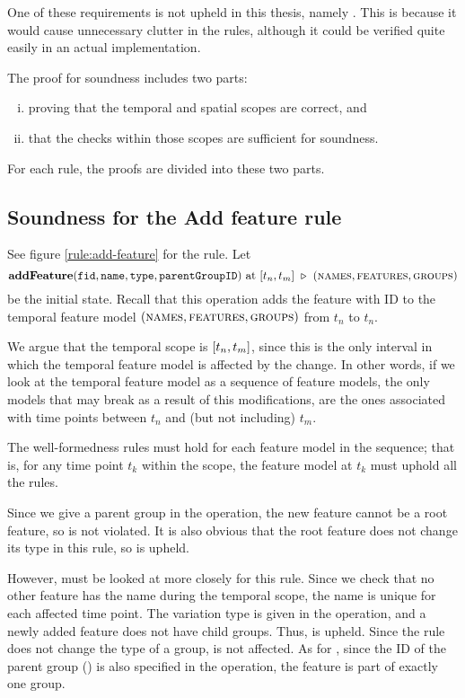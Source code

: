 One of these requirements is not upheld in this thesis, namely . This is because it would cause unnecessary clutter in the rules, although it could be verified quite easily in an actual implementation.

The proof for soundness includes two parts: 
\begin{enumerate}[(i)]
   \item proving that the temporal and spatial scopes are correct, and
   \item that the checks within those scopes are sufficient for soundness.
\end{enumerate}
For each rule, the proofs are divided into these two parts.

   

\subsection{Soundness for the Add feature rule}
\label{sub:soundness-for-the-add-feature-rule}

See figure \vref{rule:add-feature} for the  rule.
Let 
\[ \textbf{addFeature}(\var{fid}, \var{name}, \var{type}, \var{parentGroupID})\text{ at }\interval{t_n}{t_m}
\shove (\names{}, \features{}, \groups{})
\]
be the initial state. Recall that this operation adds the feature with ID  to the temporal feature model $(\textsc{names}{}, \textsc{features}{}, \textsc{groups}{}{})$ from $t_n$ to $t_n$.

We argue that the temporal scope is $\interval{t_n}{t_m}$, since this is the only interval in which the temporal feature model is affected by the change. In other words, if we look at the temporal feature model as a sequence of feature models, the only models that may break as a result of this modifications, are the ones associated with time points between $t_n$ and (but not including) $t_m$. 

The well-formedness rules must hold for each feature model in the sequence; that is, for any time point $t_k$ within the scope, the feature model at $t_k$ must uphold all the rules. 

Since we give a parent group in the operation, the new feature cannot be a root feature, so  is not violated. It is also obvious that the root feature does not change its type in this rule, so  is upheld. 

However,  must be looked at more closely for this rule. Since we check that no other feature has the name  during the temporal scope, the name is unique for each affected time point. The variation type is given in the operation, and a newly added feature does not have child groups. Thus,  is upheld. Since the rule does not change the type of a group,  is not affected. As for , since the ID of the parent group () is also specified in the operation, the feature is part of exactly one group. 

